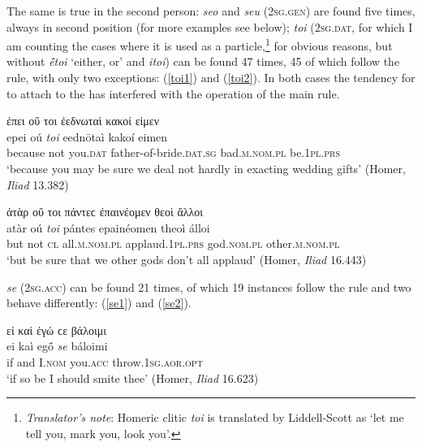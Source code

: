 The same is true in the second person: \textit{seo} and \textit{seu} (\textsc{2sg.gen}) are found five times, always in second position (for more examples see below); \textit{toi} (\textsc{2sg.dat}, for which I am counting the cases where it is used as a particle,\footnote{\emph{Translator's note}: Homeric clitic \textit{toi} is translated by Liddell-Scott as `let me tell you, mark you, look you'.} for obvious reasons, but without \textit{ḗtoi} `either, or' and \textit{itoi}) can be found 47 times, 45 of which follow the rule, with only two exceptions: (\ref{toi1}) and (\ref{toi2}). In both cases the tendency for  to attach to the \label{ouk3} has interfered with the operation of the main rule.

\begin{exe}
\ex ἐπει οὔ {τοι} ἐεδνωταὶ κακοί εἰμεν\\
\gll epei oú \emph{toi} eednōtaì kakoí eimen\\
because not you.\textsc{dat} father-of-bride.\textsc{dat.sg}
bad.\textsc{m.nom.pl} be.\textsc{1pl.prs}\\
\trans `because you may be sure we deal not hardly in exacting wedding gifts' (Homer, \textit{Iliad} 13.382)
\label{toi1}
\end{exe}

\begin{exe}
\ex ἀτὰρ οὔ {τοι} πάντεϲ ἐπαινέομεν θεοὶ ἄλλοι\\
\gll atàr oú \emph{toi} pántes epainéomen theoì álloi\\
but not \textsc{cl} all.\textsc{m.nom.pl} applaud.\textsc{1pl.prs} god.\textsc{nom.pl} other.\textsc{m.nom.pl}\\
\trans `but be sure that we other gods don't all applaud' (Homer, \textit{Iliad} 16.443)
\label{toi2}
\end{exe}

\textit{se} (\textsc{2sg.acc}) can be found 21 times, of which 19 instances follow the rule and two behave differently: (\ref{se1}) and (\ref{se2}).

\begin{exe}
\ex εἰ καὶ ἐγώ ϲε βάλοιμι\\
\gll ei kaì egṓ \emph{se} báloimi\\
if and I.\textsc{nom} you.\textsc{acc} throw.\textsc{1sg.aor.opt}\\
\trans `if so be I should smite thee' (Homer, \textit{Iliad} 16.623)
\label{se1}
\end{exe}

